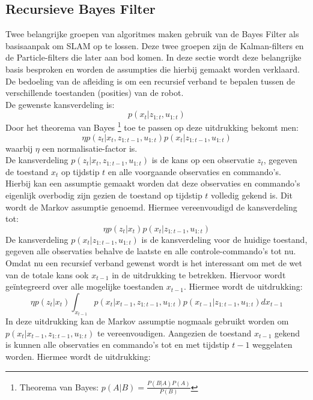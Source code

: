 \subsection{Recursieve Bayes Filter}
Twee belangrijke groepen van algoritmes maken gebruik van de Bayes Filter als basisaanpak om SLAM op te lossen. Deze twee groepen zijn de Kalman-filters en de Particle-filters die later aan bod komen. In deze sectie wordt deze belangrijke basis besproken en worden de assumpties die hierbij gemaakt worden verklaard. De bedoeling van de afleiding is om een recursief verband te bepalen tussen de verschillende toestanden (posities) van de robot.\\
De gewenste kansverdeling is:
\begin{equation*}
p(x_t|z_{1:t},u_{1:t})
\end{equation*}
Door het theorema van Bayes \footnote{Theorema van Bayes: $p(A|B) = \frac{P(B|A)P(A)}{P(B)}$} toe te passen op deze uitdrukking bekomt men:
\begin{equation*}
\eta p(z_t|x_{t},z_{1:t-1},u_{1:t})p(x_t|z_{1:t-1},u_{1:t}) 
\end{equation*}
waarbij $\eta$ een normalisatie-factor is.\\
De kansverdeling $ p(z_t|x_{t},z_{1:t-1},u_{1:t})$ is de kans op een observatie $z_t$, gegeven de toestand $x_t$ op tijdstip $t$ en alle voorgaande observaties en commando's. Hierbij kan een assumptie gemaakt worden dat deze observaties en commando's eigenlijk overbodig zijn gezien de toestand op tijdstip $t$ volledig gekend is. Dit wordt de Markov assumptie genoemd. Hiermee vereenvoudigd de kansverdeling tot:
\begin{equation*}
\eta p(z_t|x_t)p(x_t|z_{1:t-1},u_{1:t}) 
\end{equation*}
De kansverdeling $p(x_t|z_{1:t-1},u_{1:t})$ is de kansverdeling voor de huidige toestand, gegeven alle observaties behalve de laatste en alle controle-commando's tot nu. Omdat nu een recursief verband gewenst wordt is het interessant om met de wet van de totale kans ook $x_{t-1}$ in de uitdrukking te betrekken. Hiervoor wordt geïntegreerd over alle mogelijke toestanden $x_{t-1}$. Hiermee wordt de uitdrukking:
\begin{equation*}
\eta p(z_t|x_t)\int_{x_{t-1}}p(x_t|x_{t-1},z_{1:t-1},u_{1:t})p(x_{t-1}|z_{1:t-1},u_{1:t})dx_{t-1}
\end{equation*}
In deze uitdrukking kan de Markov assumptie nogmaals gebruikt worden om $p(x_t|x_{t-1},z_{1:t-1},u_{1:t})$ te vereenvoudigen. Aangezien de toestand $x_{t-1}$ gekend is kunnen alle observaties en commando's tot en met tijdstip $t-1$ weggelaten worden. Hiermee wordt de uitdrukking:
